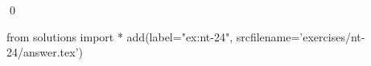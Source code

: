 
\begin{ex} 
  \label{ex:nt-24}
  
  \qed
\end{ex} 
\begin{python0}
from solutions import *
add(label="ex:nt-24",
    srcfilename='exercises/nt-24/answer.tex') 
\end{python0}

